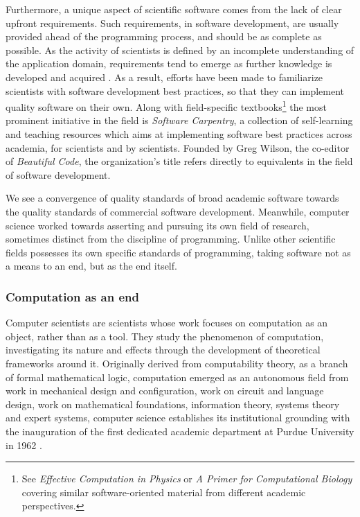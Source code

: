 Furthermore, a unique aspect of scientific software comes from the lack of clear upfront requirements. Such requirements, in software development, are usually provided ahead of the programming process, and should be as complete as possible. As the activity of scientists is defined by an incomplete understanding of the application domain, requirements tend to emerge as further knowledge is developed and acquired \citep{segal_when_2005}. As a result, efforts have been made to familiarize scientists with software development best practices, so that they can implement quality software on their own. Along with field-specific textbooks\footnote{See \emph{Effective Computation in Physics} \citep{scopatz_effective_2015} or \emph{A Primer for Computational Biology} \citep{oneil_primer_2019} covering similar software-oriented material from different academic perspectives.} the most prominent initiative in the field is \emph{Software Carpentry}, a collection of self-learning and teaching resources which aims at implementing software best practices across academia, for scientists and by scientists. Founded by Greg Wilson, the co-editor of \emph{Beautiful Code}, the organization's title refers directly to equivalents in the field of software development.

We see a convergence of quality standards of broad academic software towards the quality standards of commercial software development. Meanwhile, computer science worked towards asserting and pursuing its own field of research, sometimes distinct from the discipline of programming. Unlike other scientific fields possesses its own specific standards of programming, taking software not as a means to an end, but as the end itself.

\subsubsection{Computation as an end}
\label{subsubsec:computation-end}

Computer scientists are scientists whose work focuses on computation as an object, rather than as a tool. They study the phenomenon of computation, investigating its nature and effects through the development of theoretical frameworks around it. Originally derived from computability theory, as a branch of formal mathematical logic, computation emerged as an autonomous field from work in mechanical design and configuration, work on circuit and language design, work on mathematical foundations, information theory, systems theory and expert systems, computer science establishes its institutional grounding with the inauguration of the first dedicated academic department at Purdue University in 1962 \citep{ifrah_universal_2001}.

